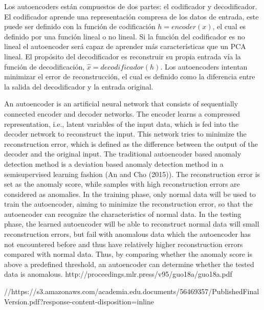 Los autoencoders est\'{a}n compuestos de dos partes: el codificador y decodificador. El codificador aprende una representaci\'{o}n compresa de los datos de entrada, este puede ser definido con la funci\'{o}n de codificaci\'{o}n $h=encoder(x)$, el cual es definido por una funci\'{o}n lineal o no lineal. Si la funci\'{o}n del codificador es no lineal el autoencoder ser\'{a} capaz de aprender m\'{a}s caracter\'{i}sticas que un PCA lineal. El prop\'{o}sito del decodificador es reconstruir su propia entrada v\'{i}a la funci\'{o}n de decodificaci\'{o}n, $\hat{x} = decodificador(h)$. Los autoencoders intentan minimizar el error de reconstrucci\'{o}n, el cual es definido como la diferencia entre la salida del decodificador y la entrada original.



An autoencoder is an artificial neural network that consists of sequentially connected encoder
and decoder networks. The encoder learns a compressed representation, i.e., latent
variables of the input data, which is fed into the decoder network to reconstruct the input.
This network tries to minimize the reconstruction error, which is defined as the difference
between the output of the decoder and the original input. The traditional autoencoder
based anomaly detection method is a deviation based anomaly detection method in a semisupervised
learning fashion (An and Cho (2015)). The reconstruction error is set as the
anomaly score, while samples with high reconstruction errors are considered as anomalies.
In the training phase, only normal data will be used to train the autoencoder, aiming to
minimize the reconstruction error, so that the autoencoder can recognize the characteristics
of normal data. In the testing phase, the learned autoencoder will be able to reconstruct
normal data will small reconstruction errors, but fail with anomalous data which the autoencoder
has not encountered before and thus have relatively higher reconstruction errors
compared with normal data. Thus, by comparing whether the anomaly score is above a
predefined threshold, an autoencoder can determine whether the tested data is anomalous. http://proceedings.mlr.press/v95/guo18a/guo18a.pdf


 //https://s3.amazonaws.com/academia.edu.documents/56469357/PublishedFinalVersion.pdf?response-content-disposition=inline%



